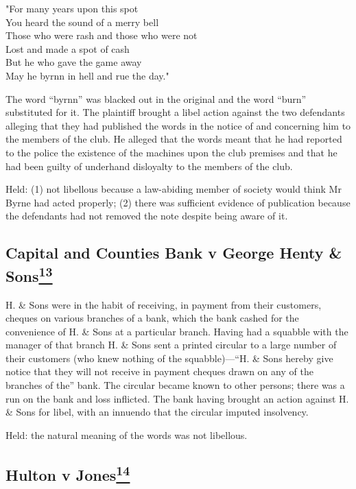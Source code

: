 \documentclass[]{article}
\begin{document}
"For many years upon this spot\\You heard the sound of a merry
bell\\Those who were rash and those who were not\\Lost and made a spot
of cash\\But he who gave the game away\\May he byrnn in hell and rue the
day."

The word ``byrnn'' was blacked out in the original and the word ``burn''
substituted for it. The plaintiff brought a libel action against the two
defendants alleging that they had published the words in the notice of
and concerning him to the members of the club. He alleged that the words
meant that he had reported to the police the existence of the machines
upon the club premises and that he had been guilty of underhand
disloyalty to the members of the club.

Held: (1) not libellous because a law-abiding member of society would
think Mr Byrne had acted properly; (2) there was sufficient evidence of
publication because the defendants had not removed the note despite
being aware of it.

\subsection{\texorpdfstring{{{Capital and Counties Bank v George Henty
\&
Sons\hyperref[sdfootnote13sym]{\textsuperscript{13}}}}}{Capital and Counties Bank v George Henty \& Sons13}}

H. \& Sons were in the habit of receiving, in payment from their
customers, cheques on various branches of a bank, which the bank cashed
for the convenience of H. \& Sons at a particular branch. Having had a
squabble with the manager of that branch H. \& Sons sent a printed
circular to a large number of their customers (who knew nothing of the
squabble)---``H. \& Sons hereby give notice that they will not receive
in payment cheques drawn on any of the branches of the'' bank. The
circular became known to other persons; there was a run on the bank and
loss inflicted. The bank having brought an action against H. \& Sons for
libel, with an innuendo that the circular imputed insolvency.

Held: the natural meaning of the words was not libellous.

\subsection{\texorpdfstring{{{Hulton v
Jones\hyperref[sdfootnote14sym]{\textsuperscript{14}}}}}{Hulton v Jones14}}
\end{document}
